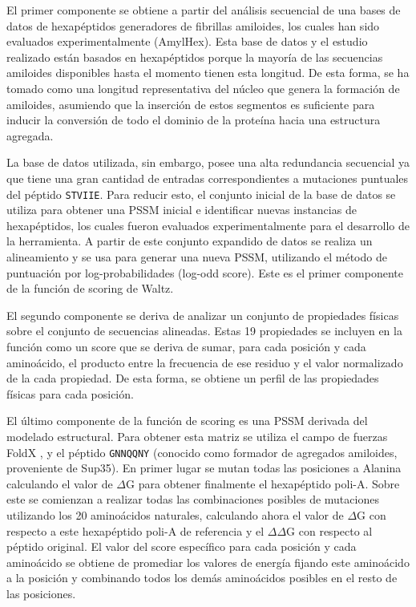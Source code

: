 El primer componente se obtiene a partir del análisis secuencial de una bases de datos de hexapéptidos generadores de fibrillas amiloides, los cuales han sido evaluados experimentalmente (AmylHex).
Esta base de datos y el estudio realizado están basados en hexapéptidos porque la mayoría de las secuencias amiloides disponibles hasta el momento tienen esta longitud.
De esta forma, se ha tomado como una longitud representativa del núcleo que genera la formación de amiloides, asumiendo que
la inserción de estos segmentos es suficiente para inducir la conversión de todo el dominio de la proteína hacia una estructura agregada. 

La base de datos utilizada, sin embargo, posee una alta redundancia secuencial ya que tiene una gran cantidad de entradas correspondientes a mutaciones puntuales del péptido \texttt{STVIIE}.
Para reducir esto, el conjunto inicial de la base de datos se utiliza para obtener una PSSM inicial e identificar nuevas instancias de hexapéptidos, los cuales fueron evaluados experimentalmente para el desarrollo de la herramienta.
A partir de este conjunto expandido de datos se realiza un alineamiento y se usa para generar una nueva PSSM, utilizando el método de puntuación por log-probabilidades (log-odd score).
Este es el primer componente de la función de scoring de Waltz.

El segundo componente se deriva de analizar un conjunto de propiedades físicas sobre el conjunto de secuencias alineadas.
Estas 19 propiedades se incluyen en la función como un score que se deriva de sumar, para cada posición y cada aminoácido, el producto entre la frecuencia de ese residuo
y el valor normalizado de la cada propiedad. De esta forma, se obtiene un perfil de las propiedades físicas para cada posición.


El último componente de la función de scoring es una PSSM derivada del modelado estructural. 
Para obtener esta matriz se utiliza el campo de fuerzas FoldX \cite{schymkowitz2005foldx}, y el péptido \texttt{GNNQQNY} (conocido como formador de agregados amiloides, proveniente de Sup35).
En primer lugar se mutan todas las posiciones a Alanina calculando el valor de $\Delta$G para obtener finalmente el hexapéptido poli-A.
Sobre este se comienzan a realizar todas las combinaciones posibles de mutaciones utilizando los 20 aminoácidos naturales, calculando ahora el valor de $\Delta$G con respecto a este hexapéptido poli-A de referencia y 
el $\Delta\Delta$G con respecto al péptido original. 
El valor del score específico para cada posición y cada aminoácido se obtiene de promediar los valores de energía fijando este aminoácido a la posición y combinando todos los demás aminoácidos posibles en el resto de las posiciones.


